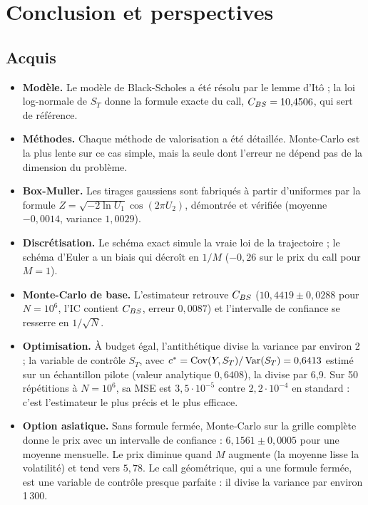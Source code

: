 \chapter*{Conclusion et perspectives}

\section*{Acquis}
\begin{itemize}
\item \textbf{Modèle.} Le modèle de Black-Scholes a été résolu par le lemme d'Itô ; la loi log-normale de $S_T$ donne la formule exacte du call, $C_{BS} = 10{,}4506$, qui sert de référence.
\item \textbf{Méthodes.} Chaque méthode de valorisation a été détaillée. Monte-Carlo est la plus lente sur ce cas simple, mais la seule dont l'erreur ne dépend pas de la dimension du problème.
\item \textbf{Box-Muller.} Les tirages gaussiens sont fabriqués à partir d'uniformes par la formule $Z = \sqrt{-2\ln U_1}\cos(2\pi U_2)$, démontrée et vérifiée (moyenne $-0{,}0014$, variance $1{,}0029$).
\item \textbf{Discrétisation.} Le schéma exact simule la vraie loi de la trajectoire ; le schéma d'Euler a un biais qui décroît en $1/M$ ($-0{,}26$ sur le prix du call pour $M = 1$).
\item \textbf{Monte-Carlo de base.} L'estimateur retrouve $C_{BS}$ ($10{,}4419\pm0{,}0288$ pour $N = 10^6$, l'IC contient $C_{BS}$, erreur $0{,}0087$) et l'intervalle de confiance se resserre en $1/\sqrt N$.
\item \textbf{Optimisation.} À budget égal, l'antithétique divise la variance par environ 2 ; la variable de contrôle $S_T$, avec $c^* = \operatorname{Cov}(Y,S_T)/\operatorname{Var}(S_T) = 0{,}6413$ estimé sur un échantillon pilote (valeur analytique $0{,}6408$), la divise par 6,9. Sur 50 répétitions à $N = 10^6$, sa MSE est $3{,}5\cdot10^{-5}$ contre $2{,}2\cdot10^{-4}$ en standard : c'est l'estimateur le plus précis et le plus efficace.
\item \textbf{Option asiatique.} Sans formule fermée, Monte-Carlo sur la grille complète donne le prix avec un intervalle de confiance : $6{,}1561\pm0{,}0005$ pour une moyenne mensuelle. Le prix diminue quand $M$ augmente (la moyenne lisse la volatilité) et tend vers $5{,}78$. Le call géométrique, qui a une formule fermée, est une variable de contrôle presque parfaite : il divise la variance par environ 1\,300.
\end{itemize}

